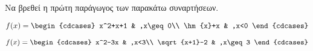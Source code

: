 Να βρεθεί η πρώτη παράγωγος των παρακάτω συναρτήσεων.
\begin{multicols}{2}
\begin{alist}
\item $ f(x)=\begin{cdcases}
x^2+x+1 & ,x\geq 0\\ \hm{x}+x & ,x<0
\end{cdcases} $
\item $ f(x)=\begin{cdcases}
x^2-3x & ,x<3\\ \sqrt{x+1}-2 & ,x\geq 3
\end{cdcases} $
\end{alist}
\end{multicols}
